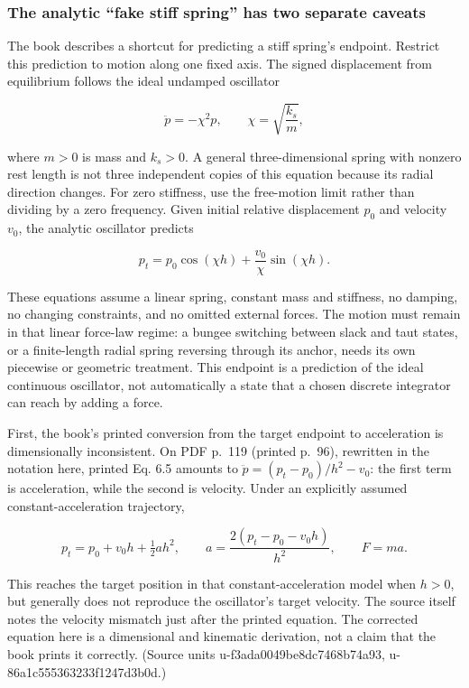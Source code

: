 \subsubsection{The analytic ``fake stiff spring'' has two separate caveats}\label{the-analytic-fake-stiff-spring-has-two-separate-caveats}

The book describes a shortcut for predicting a stiff spring's endpoint. Restrict this prediction to motion along one fixed axis. The signed displacement from equilibrium follows the ideal undamped oscillator

\[
\ddot p=-\chi^2p,\qquad \chi=\sqrt{\frac{k_s}{m}},
\]

where \(m>0\) is mass and \(k_s>0\). A general three-dimensional spring with nonzero rest length is not three independent copies of this equation because its radial direction changes. For zero stiffness, use the free-motion limit rather than dividing by a zero frequency. Given initial relative displacement \(p_0\) and velocity \(v_0\), the analytic oscillator predicts

\[
p_t=p_0\cos(\chi h)+\frac{v_0}{\chi}\sin(\chi h).
\]

These equations assume a linear spring, constant mass and stiffness, no damping, no changing constraints, and no omitted external forces. The motion must remain in that linear force-law regime: a bungee switching between slack and taut states, or a finite-length radial spring reversing through its anchor, needs its own piecewise or geometric treatment. This endpoint is a prediction of the ideal continuous oscillator, not automatically a state that a chosen discrete integrator can reach by adding a force.

First, the book's printed conversion from the target endpoint to acceleration is dimensionally inconsistent. On PDF p.~119 (printed p.~96), rewritten in the notation here, printed Eq. 6.5 amounts to \(\ddot p=(p_t-p_0)/h^2-v_0\): the first term is acceleration, while the second is velocity. Under an explicitly assumed constant-acceleration trajectory,

\[
p_t=p_0+v_0h+\tfrac12 ah^2,
\qquad
a=\frac{2(p_t-p_0-v_0h)}{h^2},
\qquad F=ma.
\]

This reaches the target position in that constant-acceleration model when \(h>0\), but generally does not reproduce the oscillator's target velocity. The source itself notes the velocity mismatch just after the printed equation. The corrected equation here is a dimensional and kinematic derivation, not a claim that the book prints it correctly. (Source units u-f3ada0049be8dc7468b74a93, u-86a1c555363233f1247d3b0d.)

